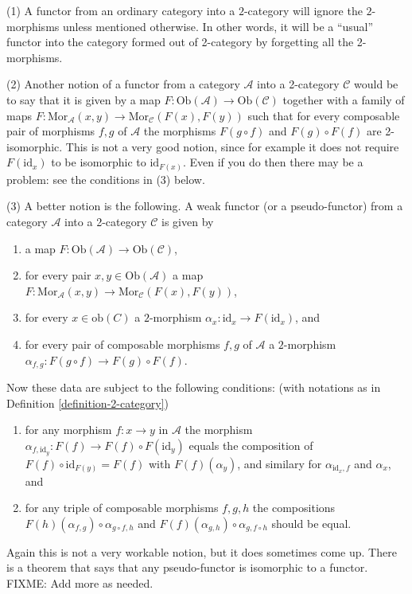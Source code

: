\begin{remarks}
\label{remarks-functor-into-2-category}
(1) A functor from an ordinary category into a $2$-category will ignore the
$2$-morphisms unless mentioned otherwise. In other words, it will be a 
``usual'' functor into the category formed out of 2-category by forgetting
all the 2-morphisms.

\medskip\noindent
(2) Another notion of a functor from a category $\mathcal{A}$ into a
2-category $\mathcal{C}$ would be to say that it is given by a map
$F : \text{Ob}(\mathcal{A}) \to \text{Ob}(\mathcal{C})$ together with a
family of maps 
$F : \text{Mor}_{\mathcal{A}}(x,y) \to \text{Mor}_{\mathcal{C}}(F(x),F(y))$
such that for every composable pair of morphisms $f,g$ of $\mathcal{A}$
the morphisms $F(g \circ f)$ and $F(g) \circ F(f)$ are 2-isomorphic. This is
not a very good notion, since for example it does not require $F(\text{id}_x)$
to be isomorphic to $\text{id}_{F(x)}$. Even if you do then
there may be a problem: see the conditions in (3) below.

\medskip\noindent
(3) A better notion is the following. A weak functor (or a pseudo-functor)
from a category $\mathcal{A}$ into a 2-category $\mathcal{C}$ is given by 
\begin{enumerate}
\item a map $F : \text{Ob}(\mathcal{A}) \to \text{Ob}(\mathcal{C})$,
\item for every pair $x,y\in \text{Ob}(\mathcal{A})$ a map
$F : \text{Mor}_{\mathcal{A}}(x,y) \to  \text{Mor}_{\mathcal{C}}(F(x),F(y))$,
\item for every $x\in \text{ob}(C)$ a $2$-morphism
$\alpha_x : \text{id}_x \to F(\text{id}_{x})$, and
\item for every pair of composable morphisms $f,g$ of $\mathcal{A}$ a 
$2$-morphism $\alpha_{f,g} : F(g \circ f) \to F(g) \circ F(f)$.
\end{enumerate}
Now these data are subject to the following conditions:
(with notations as in Definition \ref{definition-2-category})
\begin{enumerate}
\item for any morphism $f : x \to y$ in $\mathcal{A}$ the morphism
$\alpha_{f,\text{id}_y} : F(f) \to F(f) \circ F(\text{id}_y)$
equals the composition of $F(f) \circ \text{id}_{F(y)} = F(f)$ with
$F(f)(\alpha_y)$, and similary for $\alpha_{\text{id}_x,f}$ and
$\alpha_x$, and
\item for any triple of composable morphisms $f,g,h$ the
compositions $F(h)(\alpha_{f,g}) \circ \alpha_{g\circ f, h}$ and
$F(f)(\alpha_{g,h}) \circ \alpha_{g,f\circ h}$ should be equal.
\end{enumerate}
Again this is not a very workable notion, but it does sometimes come up.
There is a theorem that says that any pseudo-functor is isomorphic to
a functor. FIXME: Add more as needed.
\end{remarks}

